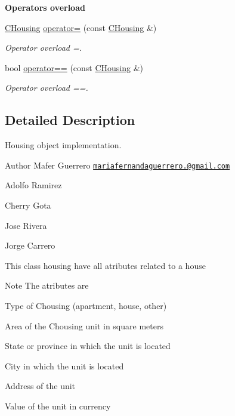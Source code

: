 \begin{Indent}{\bf Operator\textquotesingle{}s overload}\par
\begin{DoxyCompactItemize}
\item 
\hyperlink{class_c_housing}{C\+Housing} \hyperlink{class_c_housing_ab0ce97d73e0e23d00a326be11e93b600}{operator=} (const \hyperlink{class_c_housing}{C\+Housing} \&)
\begin{DoxyCompactList}\small\item\em Operator overload =. \end{DoxyCompactList}\item 
bool \hyperlink{class_c_housing_a73b234465e958af3748e1fec91a6f997}{operator==} (const \hyperlink{class_c_housing}{C\+Housing} \&)
\begin{DoxyCompactList}\small\item\em Operator overload ==. \end{DoxyCompactList}\end{DoxyCompactItemize}
\end{Indent}


\subsection{Detailed Description}
Housing object implementation. 

\begin{DoxyAuthor}{Author}
Mafer Guerrero  \href{mailto:mariafernandaguerrero.25@gmail.com}{\tt mariafernandaguerrero.@gmail.\+com} 

Adolfo Ramirez 

Cherry Gota 

Jose Rivera 

Jorge Carrero
\end{DoxyAuthor}
This class housing have all atributes related to a house \begin{DoxyNote}{Note}
The atributes are
\end{DoxyNote}

\begin{DoxyItemize}
\item Type of Chousing (apartment, house, other)
\item Area of the Chousing unit in square meters
\item State or province in which the unit is located
\item City in which the unit is located
\item Address of the unit
\item Value of the unit in currency 
\end{DoxyItemize}

